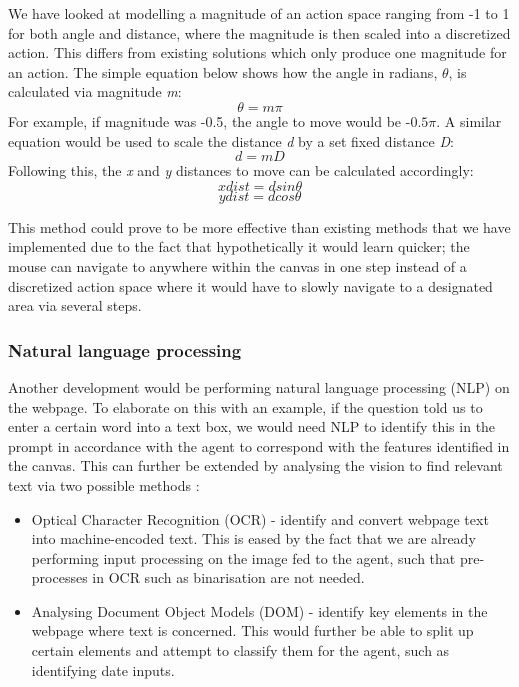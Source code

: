 \documentclass[10pt,journal,compsoc]{IEEEtran}
\begin{document}
We have looked at modelling a magnitude of an action space ranging from -1 to 1 for both angle and distance, where the magnitude is then scaled into a discretized action. This differs from existing solutions which only produce one magnitude for an action. The simple equation below shows how the angle in radians, \( \theta \), is calculated via magnitude \textit{m}:
\[ \theta=m\pi \]
For example, if magnitude was -0.5, the angle to move would be -\( 0.5\pi \). A similar equation would be used to scale the distance \textit{d} by a set fixed distance \textit{D}:
\[ d=mD \]
 Following this, the \textit{x} and \textit{y} distances to move can be calculated accordingly:
 \[ xdist=dsin\theta \]
 \[ ydist=dcos\theta \]
 
This method could prove to be more effective than existing methods that we have implemented due to the fact that hypothetically it would learn quicker; the mouse can navigate to anywhere within the canvas in one step instead of a discretized action space where it would have to slowly navigate to a designated area via several steps.

\subsubsection{Natural language processing}
Another development would be performing natural language processing (NLP) on the webpage. To elaborate on this with an example, if the question told us to enter a certain word into a text box, we would need NLP to identify this in the prompt in accordance with the agent to correspond with the features identified in the canvas. This can further be extended by analysing the vision to find relevant text via two possible methods \cite{dale2000handbook} \cite{allen2011interactive}:
\indent
\begin{itemize}
\item Optical Character Recognition (OCR) - identify and convert webpage text into machine-encoded text. This is eased by the fact that we are already performing input processing on the image fed to the agent, such that pre-processes in OCR such as binarisation are not needed. 
\item Analysing Document Object Models (DOM) - identify key elements in the webpage where text is concerned. This would further be able to split up certain elements and attempt to classify them for the agent, such as identifying date inputs.
\end{itemize}
\end{document}
